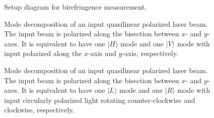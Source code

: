 \documentclass[]{report}
\begin{document}
\begin{figure}
\centering{}
\caption{Setup diagram for birefringence measurement.}
\end{figure}

\begin{figure}
\centering{}
\caption{Mode decomposition of an input quasilinear polarized laser beam. The input beam is polarized along the bisection between $ x $- and $ y $-axes. It is equivalent to have one $ |H\rangle $ mode and one $ |V\rangle $ mode with input polarized along the $ x $-axis and $ y $-axis, respectively.}
\end{figure}

\begin{figure}
\centering{}
\caption{Mode decomposition of an input quasilinear polarized laser beam. The input beam is polarized along the bisection between $ x $- and $ y $-axes. It is equivalent to have one $ |L\rangle $ mode and one $ |R\rangle $ mode with input circularly polarized light rotating counter-clockwise and clockwise, respectively.}
\end{figure}
\end{document}

